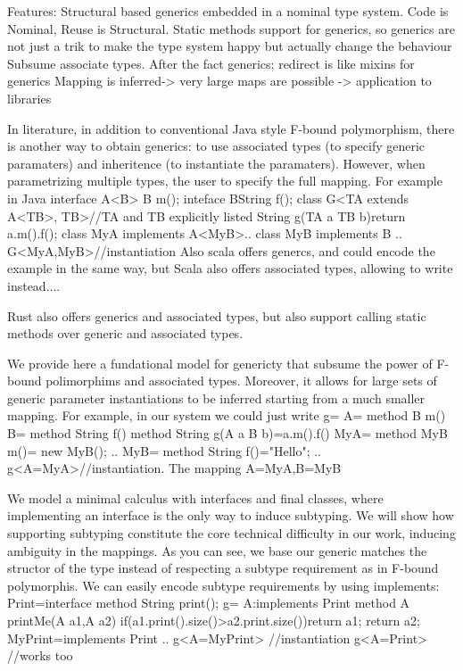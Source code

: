 Features:
Structural based generics embedded in a nominal type system.
Code is Nominal, Reuse is Structural.
Static methods support for generics, so generics are not just a trik to make the type system happy but actually
change the behaviour
Subsume associate types.
After the fact generics; redirect is like mixins for generics
Mapping is inferred-> very large maps are possible -> application to libraries


In literature, in addition to conventional Java style F-bound polymorphism, there is
another way to obtain generics: to use associated types (to specify generic paramaters) and inheritence (to instantiate the paramaters).
However, when parametrizing multiple types, the user to specify the full mapping.
For example in Java
    interface A<B>{ B m(); }
    inteface B{String f();}
    class G<TA extends A<TB>, TB>{//TA and TB explicitly listed
      String g(TA a TB b){return a.m().f();}
    }
    class MyA implements A<MyB>{..}
    class MyB implements B {..}
    G<MyA,MyB>//instantiation
Also scala offers genercs, and could encode the example in the same way, but Scala
also offers associated types, allowing to write instead....

Rust also offers generics and associated types, but also support calling static methods
over generic and associated types.

We provide here a fundational model for genericty that subsume the power
of F-bound polimorphims and  associated types.
Moreover, it allows for large sets of generic parameter instantiations to be inferred starting from a much smaller mapping.
For example, in our system we could just write
    g={
      A={ method B m()}
      B={ method String f()}
      method String g(A a B b)=a.m().f()
    }
    MyA={ method MyB m()= new MyB(); ..}
    MyB={ method String f()="Hello"; ..}
    g<A=MyA>//instantiation. The mapping A=MyA,B=MyB

We model a minimal calculus with interfaces and final classes, where implementing an interface is the only way to induce subtyping.
We will show how supporting subtyping constitute the core technical difficulty in our work, inducing ambiguity in the mappings.
As you can see, we base our generic matches the structor of the type instead of respecting a subtype requirement as in F-bound polymorphis.
We can easily encode subtype requirements by using implements:
Print=interface{ method String print();}
g={
  A:{implements Print}
  method A printMe(A a1,A a2){ if(a1.print().size()>a2.print.size()){return a1;} return a2;}
  }
MyPrint={implements Print ..}
g<A=MyPrint> //instantiation
g<A=Print> //works too


